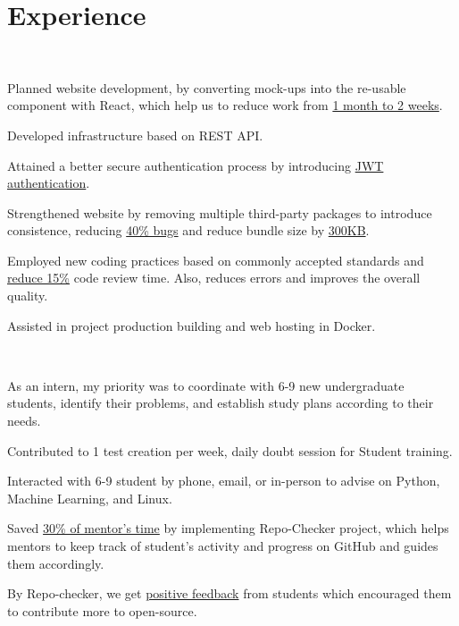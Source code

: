 \documentclass[]{Kushagra-build}
\begin{document}
\begin{minipage}[t]{0.70\textwidth} 

\section{Experience}

\\
\vspace{0.7em} 
\vspace{2em}
\begin{tightenumerate}
    \item Planned website development, by converting mock-ups into the re-usable component with React, which help us to reduce work from \underline{1 month to 2 weeks}. 
    \item Developed infrastructure based on REST API.
    \item Attained a better secure authentication process by introducing \underline{JWT authentication}.
    \item Strengthened website by removing multiple third-party packages to introduce consistence, reducing \underline{40\% bugs} and reduce bundle size by \underline{300KB}.
    \item Employed new coding practices based on commonly accepted standards and \underline{reduce 15\%} code review time. Also, reduces errors and improves the overall quality.
    \item Assisted in project production building and web hosting in Docker.
\end{tightenumerate}
\sectionsep

 \\
\vspace{0.3em} 
\vspace{0.7em} 
\begin{tightenumerate}
    \item As an intern, my priority was to coordinate with 6-9 new undergraduate students, identify their problems, and establish study plans according to their needs.
    \item Contributed to 1 test creation per week, daily doubt session for Student training.
    \item Interacted with 6-9 student by phone, email, or in-person to advise on Python, Machine Learning, and Linux.
    \item Saved \underline{30\% of mentor's time} by implementing Repo-Checker project, which helps mentors to keep track of student's activity and progress on GitHub and guides them accordingly.
    \item By Repo-checker, we get \underline{positive feedback} from students which encouraged them to contribute more to open-source.
\end{tightenumerate}
\sectionsep


\end{minipage}
\end{document}
